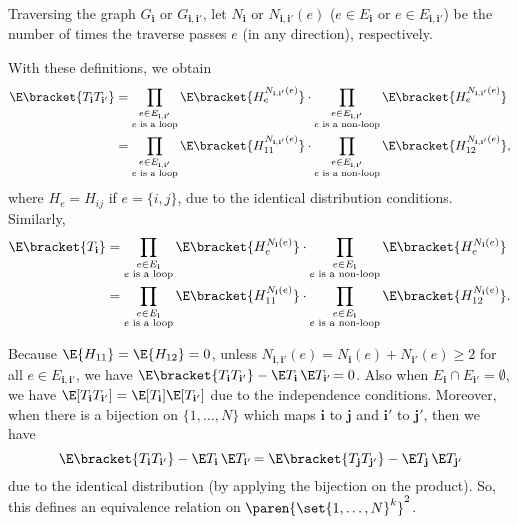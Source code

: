 \documentclass{homework}
\begin{document}
{Traversing the graph $G_{\mathbf i}$ or $G_{\mathbf i,\mathbf i'}$, let $N_{\mathbf i}$ or $N_{\mathbf i,\mathbf i'}(e)$ ($e\in E_{\mathbf i}$ or $e\in E_{\mathbf i,\mathbf i'}$) be the number of times the traverse passes $e$ (in any direction), respectively.

\setlength{\leftskip}{0cm}
With these definitions, we obtain
\begin{align*}
    \E\bracket{T_{\mathbf i}T_{\mathbf i'}} &= \prod_{\substack{e\in E_{\mathbf i,\mathbf i'} \\ \text{$e$ is a loop}}} \E\bracket{ H_e^{N_{\mathbf i,\mathbf i'} (e)} }\cdot \prod_{\substack{e\in E_{\mathbf i,\mathbf i'} \\ \text{$e$ is a non-loop}}} \E\bracket{ H_e^{N_{\mathbf i,\mathbf i'} (e)} }
    \\ &= \prod_{\substack{e\in E_{\mathbf i,\mathbf i'} \\ \text{$e$ is a loop}}} \E\bracket{ H_{11}^{N_{\mathbf i,\mathbf i'} (e)} }\cdot \prod_{\substack{e\in E_{\mathbf i,\mathbf i'} \\ \text{$e$ is a non-loop}}} \E\bracket{ H_{12}^{N_{\mathbf i,\mathbf i'} (e)} },
\end{align*}
where $H_e = H_{ij}$ if $e=\{i,j\}$, due to the identical distribution conditions. Similarly,
\begin{align*}
    \E\bracket{T_{\mathbf i}} &= \prod_{\substack{e\in E_{\mathbf i} \\ \text{$e$ is a loop}}} \E\bracket{ H_e^{N_{\mathbf i} (e)} }\cdot \prod_{\substack{e\in E_{\mathbf i} \\ \text{$e$ is a non-loop}}} \E\bracket{ H_e^{N_{\mathbf i} (e)} }
    \\ &= \prod_{\substack{e\in E_{\mathbf i} \\ \text{$e$ is a loop}}} \E\bracket{ H_{11}^{N_{\mathbf i} (e)} }\cdot \prod_{\substack{e\in E_{\mathbf i} \\ \text{$e$ is a non-loop}}} \E\bracket{ H_{12}^{N_{\mathbf i} (e)} }.
\end{align*}

Because $\E{H_{11}}=\E{H_{12}} = 0$, unless $N_{\mathbf i,\mathbf i'} (e)= N_{\mathbf i}(e) +N_{\mathbf i'}(e) \ge 2$ for all $e\in E_{\mathbf i,\mathbf i'}$, we have $\E\bracket{T_{\mathbf i}T_{\mathbf i'} } - \E T_{\mathbf i}\,\E T_{\mathbf i'\!} = 0$. Also when $E_{\mathbf i} \cap E_{\mathbf i'}= \emptyset$, we have $\E[T_{\mathbf i}T_{\mathbf i'}] = \E[T_{\mathbf i}] \E[T_{\mathbf i'}]$ due to the independence conditions. Moreover, when there is a bijection on $\{1,\dots, N\}$ which maps $\mathbf i$ to $\mathbf j$ and $\mathbf i'$ to $\mathbf j'$, then we have
$$ \E\bracket{T_{\mathbf i}T_{\mathbf i'} } - \E T_{\mathbf i}\,\E T_{\mathbf i'\!} = \E\bracket{T_{\mathbf j}T_{\mathbf j'} } - \E T_{\mathbf j}\,\E T_{\mathbf j'\!} $$
due to the identical distribution (by applying the bijection on the product). So, this defines an equivalence relation on $\paren{\set{1,\dots,N}^k}^2$.

}
\end{document}
